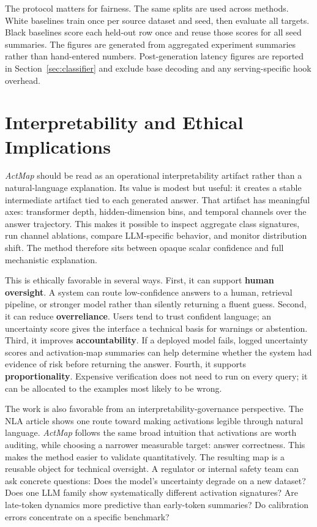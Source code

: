 \documentclass{article}
\newcommand{\actmap}{\textit{ActMap}}
\begin{document}
The protocol matters for fairness. The same splits are used across methods. White baselines train once per source dataset and seed, then evaluate all targets. Black baselines score each held-out row once and reuse those scores for all seed summaries. The figures are generated from aggregated experiment summaries rather than hand-entered numbers. Post-generation latency figures are reported in Section~\ref{sec:classifier} and exclude base decoding and any serving-specific hook overhead.

\section{Interpretability and Ethical Implications}

\actmap{} should be read as an operational interpretability artifact rather than a natural-language explanation. Its value is modest but useful: it creates a stable intermediate artifact tied to each generated answer. That artifact has meaningful axes: transformer depth, hidden-dimension bins, and temporal channels over the answer trajectory. This makes it possible to inspect aggregate class signatures, run channel ablations, compare LLM-specific behavior, and monitor distribution shift. The method therefore sits between opaque scalar confidence and full mechanistic explanation.

This is ethically favorable in several ways. First, it can support \textbf{human oversight}. A system can route low-confidence answers to a human, retrieval pipeline, or stronger model rather than silently returning a fluent guess. Second, it can reduce \textbf{overreliance}. Users tend to trust confident language; an uncertainty score gives the interface a technical basis for warnings or abstention. Third, it improves \textbf{accountability}. If a deployed model fails, logged uncertainty scores and activation-map summaries can help determine whether the system had evidence of risk before returning the answer. Fourth, it supports \textbf{proportionality}. Expensive verification does not need to run on every query; it can be allocated to the examples most likely to be wrong.

The work is also favorable from an interpretability-governance perspective. The NLA article shows one route toward making activations legible through natural language. \actmap{} follows the same broad intuition that activations are worth auditing, while choosing a narrower measurable target: answer correctness. This makes the method easier to validate quantitatively. The resulting map is a reusable object for technical oversight. A regulator or internal safety team can ask concrete questions: Does the model's uncertainty degrade on a new dataset? Does one LLM family show systematically different activation signatures? Are late-token dynamics more predictive than early-token summaries? Do calibration errors concentrate on a specific benchmark?
\end{document}
